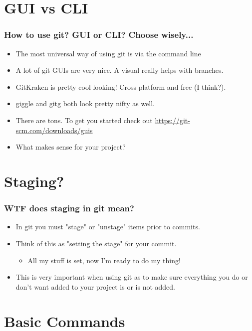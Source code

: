 \documentclass{beamer}
\begin{document}
\section{GUI vs CLI}
\begin{frame}
    \frametitle{How to use git? GUI or CLI? Choose wisely...}
    \begin{itemize}
        \item{The most universal way of using git is via the command line}
        \item{A lot of git GUIs are very nice. A visual really helps with branches.}
        \item{GitKraken is pretty cool looking! Cross platform and free (I think?).}
        \item{giggle and gitg both look pretty nifty as well.}
        \item{There are tons. To get you started check out \url{https://git-scm.com/downloads/guis}}
        \item{What makes sense for your project?}
    \end{itemize}
\end{frame}

\section{Staging?}
\begin{frame}
    \frametitle{WTF does staging in git mean?}
    \begin{itemize}
        \item{In git you must "stage" or "unstage" items prior to commits.}
        \item{Think of this as "setting the stage" for your commit.}
            \begin{itemize}
                \item{All my stuff is set, now I'm ready to do my thing!}
            \end{itemize}
        \item{This is very important when using git as to make sure everything you do or don't want added to your project is or is not added.}
    \end{itemize}
\end{frame}

\section{Basic Commands}
\end{document}
